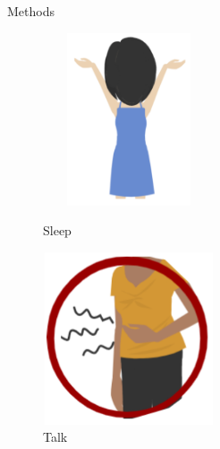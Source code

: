 \documentclass[final]{beamer}
\newlength{\colwidth}
\begin{document}
\begin{frame}[t]
\begin{columns}[t]
\begin{column}{\colwidth}
\begin{block}{Methods}
\begin{figure}
\begin{minipage}[t]{0.2\linewidth}
        \centering
        \includegraphics[width=2in, height=2in]{figures/plip.png}
        \caption{Sleep}
      \end{minipage}
      \begin{minipage}[t]{0.2\linewidth}
        \centering
        \includegraphics[width=2in, height=2in]{figures/terb.png}
        \caption{Talk}
      \end{minipage}
    \end{figure}
    

\end{block}
\end{column}
\end{columns}
\end{frame}
\end{document}
